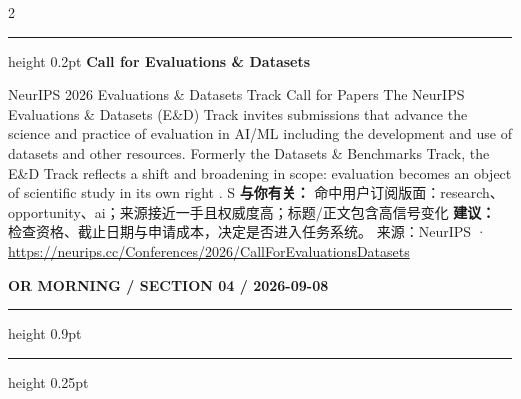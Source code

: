 \documentclass[10.5pt]{ctexart}
\begin{document}
\begin{multicols}{2}
\vspace{2mm}
\hrule height 0.2pt
\vspace{2mm}
{\large\bfseries Call for Evaluations \& Datasets}\par
NeurIPS 2026 Evaluations \& Datasets Track Call for Papers The NeurIPS Evaluations \& Datasets (E\&D) Track invites submissions that advance the science and practice of evaluation in AI/ML including the development and use of datasets and other resources. Formerly the Datasets \& Benchmarks Track, the E\&D Track reflects a shift and broadening in scope: evaluation becomes an object of scientific study in its own right . S
\textbf{与你有关：} 命中用户订阅版面：research、opportunity、ai；来源接近一手且权威度高；标题/正文包含高信号变化
\textbf{建议：} 检查资格、截止日期与申请成本，决定是否进入任务系统。
{\footnotesize\color{ormuted} 来源：NeurIPS · \url{https://neurips.cc/Conferences/2026/CallForEvaluationsDatasets}}
\end{multicols}
\newpage
{\small\bfseries OR MORNING / SECTION 04 / 2026-09-08}
\vspace{2mm}
\hrule height 0.9pt
\vspace{1.5mm}
\hrule height 0.25pt
\vspace{4mm}
\end{document}

